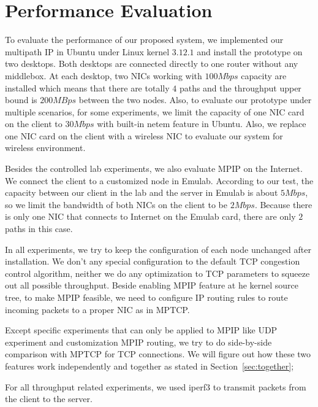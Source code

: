\section{Performance Evaluation}
\label{sec:evaluation}

To evaluate the performance of our proposed system, we implemented our multipath IP in Ubuntu under Linux kernel $3.12.1$ and install the prototype on two desktops. Both desktops are connected directly to one router without any middlebox. At each desktop, two NICs working with $100Mbps$ capacity are installed which means that there are totally $4$ paths and the throughput upper bound is $200MBps$ between the two nodes. Also, to evaluate our prototype under multiple scenarios, for some experiments, we limit the capacity of one NIC card on the client to $30Mbps$ with built-in netem feature in Ubuntu. Also, we replace one NIC card on the client with a wireless NIC to evaluate our system for wireless environment.

Besides the controlled lab experiments, we also evaluate MPIP on the Internet. We connect the client to a customized node in Emulab. According to our test, the capacity between our client in the lab and the server in Emulab is about $5Mbps$, so we limit the bandwidth of both NICs on the client to be $2Mbps$. Because there is only one NIC that connects to Internet on the Emulab card, there are only $2$ paths in this case.

In all experiments, we try to keep the configuration of each node unchanged after installation. We don't any special configuration to the default TCP congestion control algorithm, neither we do any optimization to TCP parameters to squeeze out all possible throughput. Beside enabling MPIP feature at he kernel source tree, to make MPIP feasible, we need to configure IP routing rules to route incoming packets to a proper NIC as in MPTCP.

Except specific experiments that can only be applied to MPIP like UDP experiment and customization MPIP routing, we try to do side-by-side comparison with MPTCP for TCP connections. We will figure out how these two features work independently and together as stated in Section~\ref{sec:together};

For all throughput related experiments, we used iperf3 to transmit packets from the client to the server.


